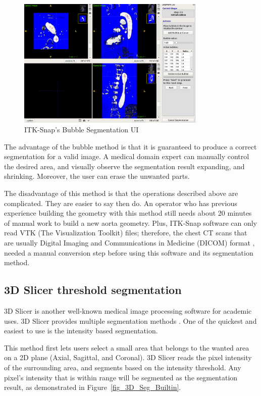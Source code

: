 \begin{figure}[ht]
    \centering
    \includegraphics[width=0.8\textwidth]{figures/AGR/bubbles.png}
    \caption[ITK-Snap's Bubble Segmentation UI]{ITK-Snap's Bubble Segmentation UI \cite{py06nimg}}
    \label{fig_ITK}
\end{figure}

The advantage of the bubble method is that it is guaranteed to produce a correct segmentation for a valid image. A medical domain expert can manually control the desired area, and visually observe the segmentation result expanding, and shrinking. Moreover, the user can erase the unwanted parts.

The disadvantage of this method is that the operations described above are complicated. They are easier to say then do. An operator who has previous experience building the geometry with this method still needs about 20 minutes of manual work to build a new aorta geometry. Plus, ITK-Snap software can only read VTK (The Visualization Toolkit) files; therefore, the chest CT scans that are usually Digital Imaging and Communications in Medicine (DICOM) format \cite{10.1007/978-1-4020-8752-3_13}, needed a manual conversion step before using this software and its segmentation method.

\subsection{3D Slicer threshold segmentation}
3D Slicer is another well-known medical image processing software for academic uses. 3D Slicer provides multiple segmentation methods \cite{Slicer_Wiki}. One of the quickest and easiest to use is the intensity based segmentation.

This method first lets users select a small area that belongs to the wanted area on a 2D plane (Axial, Sagittal, and Coronal). 3D Slicer reads the pixel intensity of the surrounding area, and segments based on the intensity threshold. Any pixel's intensity that is within range will be segmented as the segmentation result, as demonstrated in Figure~\ref{fig_3D_Seg_Builtin}. 

